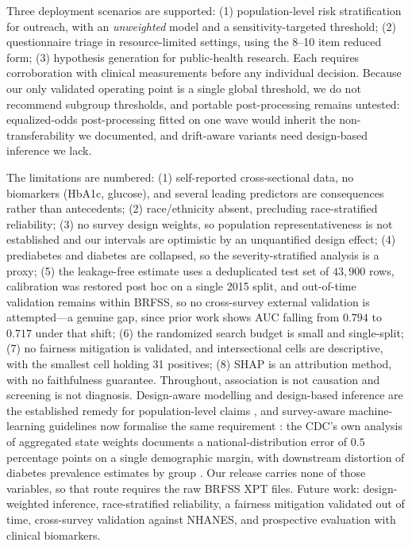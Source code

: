 \documentclass[conference]{IEEEtran}
\begin{document}
Three deployment scenarios are supported: (1) population-level risk stratification for outreach, with an \emph{unweighted} model and a sensitivity-targeted threshold; (2) questionnaire triage in resource-limited settings, using the 8--10 item reduced form; (3) hypothesis generation for public-health research. Each requires corroboration with clinical measurements before any individual decision. Because our only validated operating point is a single global threshold, we do not recommend subgroup thresholds, and portable post-processing remains untested: equalized-odds post-processing fitted on one wave would inherit the non-transferability we documented, and drift-aware variants need design-based inference we lack.

The limitations are numbered: (1) self-reported cross-sectional data, no biomarkers (HbA1c, glucose), and several leading predictors are consequences rather than antecedents; (2) race/ethnicity absent, precluding race-stratified reliability; (3) no survey design weights, so population representativeness is not established and our intervals are optimistic by an unquantified design effect; (4) prediabetes and diabetes are collapsed, so the severity-stratified analysis is a proxy; (5) the leakage-free estimate uses a deduplicated test set of $43{,}900$ rows, calibration was restored post hoc on a single 2015 split, and out-of-time validation remains within BRFSS, so no cross-survey external validation is attempted---a genuine gap, since prior work shows AUC falling from $0.794$ to $0.717$ under that shift; (6) the randomized search budget is small and single-split; (7) no fairness mitigation is validated, and intersectional cells are descriptive, with the smallest cell holding 31 positives; (8) SHAP is an attribution method, with no faithfulness guarantee. Throughout, association is not causation and screening is not diagnosis. Design-aware modelling and design-based inference are the established remedy for population-level claims \cite{matabuena2024screening}, and survey-aware machine-learning guidelines now formalise the same requirement \cite{saml}: the CDC's own analysis of aggregated state weights documents a national-distribution error of $0.5$ percentage points on a single demographic margin, with downstream distortion of diabetes prevalence estimates by group \cite{brfssweighting}. Our release carries none of those variables, so that route requires the raw BRFSS XPT files. Future work: design-weighted inference, race-stratified reliability, a fairness mitigation validated out of time, cross-survey validation against NHANES, and prospective evaluation with clinical biomarkers.
\end{document}
